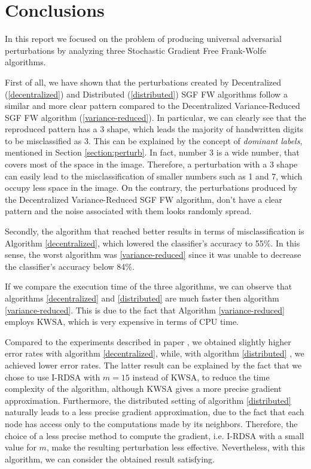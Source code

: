 \section{Conclusions}
In this report we focused on the problem of producing universal adversarial perturbations by analyzing three
Stochastic Gradient Free Frank-Wolfe algorithms.

First of all, we have shown that the perturbations created by Decentralized (\ref{decentralized}) and Distributed (\ref{distributed})
SGF FW algorithms follow a similar and more clear pattern compared to the Decentralized Variance-Reduced SGF FW
algorithm (\ref{variance-reduced}). In particular, we can clearly see that the reproduced pattern has a 3 shape, which
leads the majority of handwritten digits to be misclassified as 3. This can be explained by the concept of \textit{dominant labels},
mentioned in Section \ref{section:perturb}. In fact, number 3 is a wide number, that covers most of the space in the image. Therefore, a
perturbation with a 3 shape can easily lead to the misclassification of smaller numbers such as 1 and 7, which occupy
less space in the image. On the contrary, the perturbations produced by the Decentralized Variance-Reduced SGF FW algorithm,
don't have a clear pattern and the noise associated with them looks randomly spread.

Secondly, the algorithm that reached better results in terms of misclassification is Algorithm \ref{decentralized},
which lowered the classifier's accuracy to 55\%. In this sense, the worst algorithm was \ref{variance-reduced} since
it was unable to decrease the classifier's accuracy below 84\%.

If we compare the execution time of the three algorithms, we can observe that algorithms \ref{decentralized} and \ref{distributed}
are much faster then algorithm \ref{variance-reduced}. This is due to the fact that Algorithm \ref{variance-reduced}
employs KWSA, which is very expensive in terms of CPU time.

Compared to the experiments described in paper \cite{A3}, we obtained slightly higher error rates with algorithm
\ref{decentralized}, while, with algorithm \ref{distributed} , we achieved lower error rates. The latter result can be
explained by the fact that we chose to use I-RDSA with $m=15$ instead of KWSA, to reduce the time complexity of the algorithm,
although KWSA gives a more precise gradient approximation. Furthermore, the distributed setting of algorithm \ref{distributed}
naturally leads to a less precise gradient approximation, due to the fact that each node has access only to the
computations made by its neighbors. Therefore, the choice of a less precise method to compute the gradient, i.e. I-RDSA with a
small value for $m$, make the resulting perturbation less effective. Nevertheless, with this algorithm, we can consider the obtained result satisfying.



